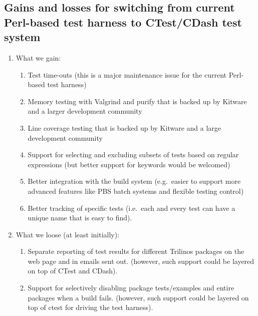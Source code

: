 \documentclass[pdf,ps2pdf,11pt]{SANDreport}
\begin{document}
%
\subsection{Gains and losses for switching from current Perl-based test
harness to CTest/CDash test system}
%

\begin{enumerate}

{}\item What we gain:

  \begin{enumerate}

  {}\item Test time-outs (this is a major maintenance issue for the
  current Perl-based test harness)

  {}\item Memory testing with Valgrind and purify that is backed up by
  Kitware and a larger development community

  {}\item Line coverage testing that is backed up by Kitware and a
  large development community

  {}\item Support for selecting and excluding subsets of tests based
  on regular expressions (but better support for keywords would be
  welcomed)

  {}\item Better integration with the build system (e.g.\ easier to
  support more advanced features like PBS batch systems and flexible
  testing control)

  {}\item Better tracking of specific tests (i.e.\ each and every test
  can have a unique name that is easy to find).

  \end{enumerate}

{}\item What we loose (at least initially):

  \begin{enumerate}

  {}\item Separate reporting of test results for different Trilinos
  packages on the web page and in emails sent out. (however, such
  support could be layered on top of CTest and CDash).

  {}\item Support for selectively disabling package tests/examples and
  entire packages when a build fails.  (however, such support could be
  layered on top of ctest for driving the test harness).

  \end{enumerate}

\end{enumerate}
\end{document}
